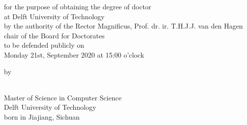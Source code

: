 \begin{small}

\begin{center}for the purpose of obtaining the degree of doctor\\
\vspace{1mm}
at Delft University of Technology\\
\vspace{1mm}
by the authority of the Rector Magnificus, Prof. dr. ir. T.H.J.J. van den Hagen\\
\vspace{1mm}
chair of the Board for Doctorates\\
\vspace{1mm}
to be defended publicly on\\
\vspace{1mm}
Monday 21st, September 2020 at 15:00 o'clock
\vspace{1mm}
\vspace{10mm} %

by

\vspace{10mm}
\textbf{\theauthor}\\
\vspace{1mm}
Master of Science in Computer Science\\
\vspace{1mm}
Delft University of Technology\\
\vspace{1mm}
born in Jiajiang, Sichuan
\vspace{1mm}
\end{center}

\end{small}


